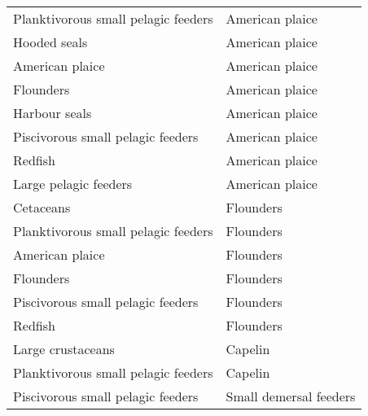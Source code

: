 \documentclass[letterpaper]{article}
\begin{document}
\begin{table}[h!]
\begin{tabular}{|l|l|}
      Planktivorous small pelagic feeders & American plaice   \\
      Hooded seals                        & American plaice   \\
      American plaice                     & American plaice   \\
      Flounders                           & American plaice   \\
      Harbour seals                       & American plaice   \\
      Piscivorous small pelagic feeders   & American plaice   \\
      Redfish                             & American plaice   \\
      Large pelagic feeders               & American plaice   \\
      Cetaceans                           & Flounders \\
      Planktivorous small pelagic feeders & Flounders \\
      American plaice                     & Flounders \\
      Flounders                           & Flounders \\
      Piscivorous small pelagic feeders   & Flounders \\
      Redfish                             & Flounders \\
      Large crustaceans                   & Capelin   \\
      Planktivorous small pelagic feeders & Capelin   \\
      Piscivorous small pelagic feeders   & Small demersal feeders    \\
      \hline
  \end{tabular}
\end{table}
\end{document}
